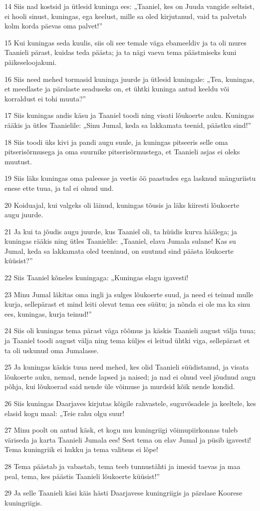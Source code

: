 \par 14 Siis nad kostsid ja ütlesid kuninga ees: „Taaniel, kes on Juuda vangide seltsist, ei hooli sinust, kuningas, ega keelust, mille sa oled kirjutanud, vaid ta palvetab kolm korda päevas oma palvet!”
\par 15 Kui kuningas seda kuulis, siis oli see temale väga ebameeldiv ja ta oli mures Taanieli pärast, kuidas teda päästa; ja ta nägi vaeva tema päästmiseks kuni päikeseloojakuni.
\par 16 Siis need mehed tormasid kuninga juurde ja ütlesid kuningale: „Tea, kuningas, et meedlaste ja pärslaste seaduseks on, et ühtki kuninga antud keeldu või korraldust ei tohi muuta?”
\par 17 Siis kuningas andis käsu ja Taaniel toodi ning visati lõukoerte auku. Kuningas rääkis ja ütles Taanielile: „Sinu Jumal, keda sa lakkamata teenid, päästku sind!”
\par 18 Siis toodi üks kivi ja pandi augu suule, ja kuningas pitseeris selle oma pitserisõrmusega ja oma suurnike pitserisõrmustega, et Taanieli asjas ei oleks muutust.
\par 19 Siis läks kuningas oma paleesse ja veetis öö paastudes ega lasknud mänguriistu enese ette tuua, ja tal ei olnud und.
\par 20 Koiduajal, kui valgeks oli läinud, kuningas tõusis ja läks kiiresti lõukoerte augu juurde.
\par 21 Ja kui ta jõudis augu juurde, kus Taaniel oli, ta hüüdis kurva häälega; ja kuningas rääkis ning ütles Taanielile: „Taaniel, elava Jumala sulane! Kas su Jumal, keda sa lakkamata oled teeninud, on suutnud sind päästa lõukoerte küüsist?”
\par 22 Siis Taaniel kõneles kuningaga: „Kuningas elagu igavesti!
\par 23 Minu Jumal läkitas oma ingli ja sulges lõukoerte suud, ja need ei teinud mulle kurja, sellepärast et mind leiti olevat tema ees süütu; ja nõnda ei ole ma ka sinu ees, kuningas, kurja teinud!”
\par 24 Siis oli kuningas tema pärast väga rõõmus ja käskis Taanieli august välja tuua; ja Taaniel toodi august välja ning tema küljes ei leitud ühtki viga, sellepärast et ta oli uskunud oma Jumalasse.
\par 25 Ja kuningas käskis tuua need mehed, kes olid Taanieli süüdistanud, ja visata lõukoerte auku, nemad, nende lapsed ja naised; ja nad ei olnud veel jõudnud augu põhja, kui lõukoerad said nende üle võimuse ja murdsid kõik nende kondid.
\par 26 Siis kuningas Daarjaves kirjutas kõigile rahvastele, suguvõsadele ja keeltele, kes elasid kogu maal: „Teie rahu olgu suur!
\par 27 Minu poolt on antud käsk, et kogu mu kuningriigi võimupiirkonnas tuleb väriseda ja karta Taanieli Jumala ees! Sest tema on elav Jumal ja püsib igavesti! Tema kuningriik ei hukku ja tema valitsus ei lõpe!
\par 28 Tema päästab ja vabastab, tema teeb tunnustähti ja imesid taevas ja maa peal, tema, kes päästis Taanieli lõukoerte küüsist!”
\par 29 Ja selle Taanieli käsi käis hästi Daarjavese kuningriigis ja pärslase Koorese kuningriigis.


